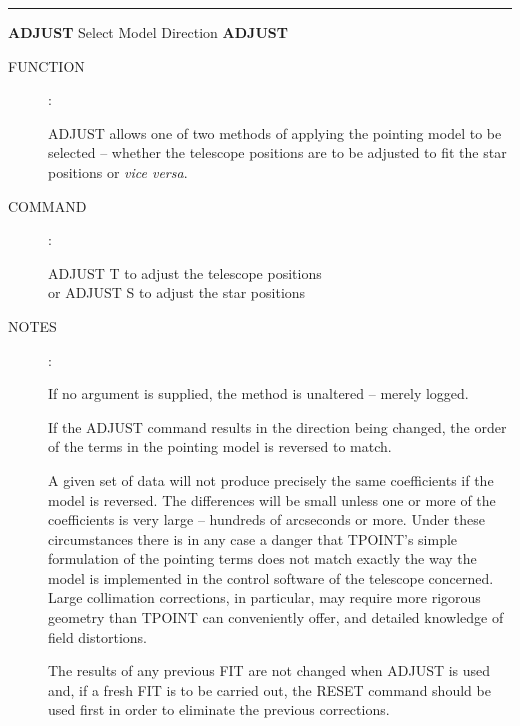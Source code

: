 \goodbreak
\rule{\textwidth}{0.3mm}
{\Large {\bf ADJUST} \hfill Select Model Direction \hfill {\bf ADJUST}}
\begin{description}
\item [FUNCTION]:

ADJUST allows one of two methods of applying the
pointing model to be selected -- whether the telescope positions
are to be adjusted to fit the star positions or {\it vice versa}.

\item [COMMAND]:

\begin{cmd}
\> \> ADJUST T \> to adjust the telescope positions \\
\> or \> ADJUST S \> to adjust the star positions
\end{cmd}

\item [NOTES]:

If no argument is supplied, the method is unaltered -- merely
logged.

If the ADJUST command results in the direction being changed,
the order of the terms in the pointing model is reversed to match.

A given set of data will not produce precisely the same
coefficients if the model is reversed.  The differences will
be small unless one or more of the coefficients is very
large -- hundreds of arcseconds or more.  Under these
circumstances there is in any case a danger that TPOINT's
simple formulation of the pointing terms does not match
exactly the way the model is implemented in the control
software of the telescope concerned.  Large collimation
corrections, in particular, may require more rigorous
geometry than TPOINT can conveniently offer, and detailed
knowledge of field distortions.

The results of any previous FIT are not changed when ADJUST is
used and, if a fresh FIT is to be carried out, the RESET command
should be used first in order to eliminate the previous corrections.

\end{description}


